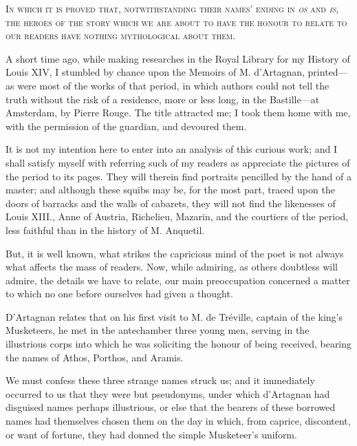

\begin{center}\scshape
In which it is proved that, notwithstanding their names' ending in \textit{os} and \textit{is}, the heroes of the story which we are about to have the honour to relate to our readers have nothing mythological about them. 
\end{center}
	
	A short time ago, while making researches in the Royal Library for my History of Louis XIV, I stumbled by chance upon the Memoirs of M. d'Artagnan, printed---as were most of the works of that period, in which authors could not tell the truth without the risk of a residence, more or less long, in the Bastille---at Amsterdam, by Pierre Rouge. The title attracted me; I took them home with me, with the permission of the guardian, and devoured them. 

It is not my intention here to enter into an analysis of this curious work; and I shall satisfy myself with referring such of my readers as appreciate the pictures of the period to its pages. They will therein find portraits pencilled by the hand of a master; and although these squibs may be, for the most part, traced upon the doors of barracks and the walls of cabarets, they will not find the likenesses of Louis XIII., Anne of Austria, Richelieu, Mazarin, and the courtiers of the period, less faithful than in the history of M. Anquetil. 

But, it is well known, what strikes the capricious mind of the poet is not always what affects the mass of readers. Now, while admiring, as others doubtless will admire, the details we have to relate, our main preoccupation concerned a matter to which no one before ourselves had given a thought. 

D'Artagnan relates that on his first visit to M. de Tréville, captain of the king's Musketeers, he met in the antechamber three young men, serving in the illustrious corps into which he was soliciting the honour of being received, bearing the names of Athos, Porthos, and Aramis. 

We must confess these three strange names struck us; and it immediately occurred to us that they were but pseudonyms, under which d'Artagnan had disguised names perhaps illustrious, or else that the bearers of these borrowed names had themselves chosen them on the day in which, from caprice, discontent, or want of fortune, they had donned the simple Musketeer's uniform. 

